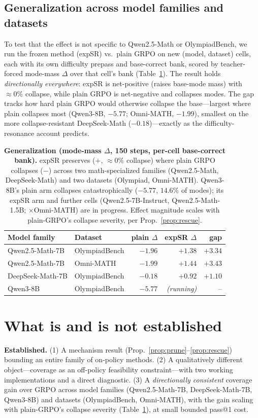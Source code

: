 \documentclass[11pt]{article}
\theoremstyle{definition}
\begin{document}
\subsection{Generalization across model families and datasets}
To test that the effect is not specific to Qwen2.5-Math or OlympiadBench, we run the frozen method
(expSR) vs.\ plain GRPO on new (model, dataset) cells, each with its own difficulty prepass and
base-correct bank, scored by teacher-forced mode-mass $\Delta$ over that cell's bank
(Table~\ref{tab:diversity}). The result holds \emph{directionally everywhere}: expSR is net-positive
(raises base-mode mass) with $\approx0\%$ collapse, while plain GRPO is net-negative and collapses
modes. The gap tracks how hard plain GRPO would otherwise collapse the base---largest where plain
collapses most (Qwen3-8B, $-5.77$; Omni-MATH, $-1.99$), smallest on the more collapse-resistant
DeepSeek-Math ($-0.18$)---exactly as the difficulty-resonance account predicts.

\begin{table}[h]\centering\small
\begin{tabular}{llrrr}
\toprule
Model family & Dataset & plain $\Delta$ & expSR $\Delta$ & gap \\
\midrule
Qwen2.5-Math-7B      & OlympiadBench & $-1.96$ & $\mathbf{+1.38}$ & $+3.34$\\
Qwen2.5-Math-7B      & Omni-MATH     & $-1.99$ & $\mathbf{+1.44}$ & $+3.43$\\
DeepSeek-Math-7B     & OlympiadBench & $-0.18$ & $\mathbf{+0.92}$ & $+1.10$\\
Qwen3-8B             & OlympiadBench & $-5.77$ & \emph{(running)} & --\\
\bottomrule
\end{tabular}
\caption{\textbf{Generalization (mode-mass $\Delta$, 150 steps, per-cell base-correct bank).} expSR
preserves ($+$, $\approx0\%$ collapse) where plain GRPO collapses ($-$) across two math-specialized
families (Qwen2.5-Math, DeepSeek-Math) and two datasets (Olympiad, Omni-MATH). Qwen3-8B's plain arm
collapses catastrophically ($-5.77$, $14.6\%$ of modes); its expSR arm and further cells
(Qwen2.5-7B-Instruct, Qwen2.5-Math-1.5B; $\times$Omni-MATH) are in progress. Effect magnitude scales
with plain-GRPO's collapse severity, per Prop.~\ref{prop:rescue}.}
\label{tab:diversity}
\end{table}

\section{What is and is not established}
\textbf{Established.} (1) A mechanism result (Prop.~\ref{prop:prune}--\ref{prop:rescue}) bounding an
entire family of on-policy methods. (2) A qualitatively different object---coverage as an off-policy
feasibility constraint---with two working implementations and a direct diagnostic. (3) A
\emph{directionally consistent} coverage gain over GRPO across model families (Qwen2.5-Math-7B,
DeepSeek-Math-7B, Qwen3-8B) and datasets (OlympiadBench, Omni-MATH), with the gain scaling with
plain-GRPO's collapse severity (Table~\ref{tab:diversity}), at small bounded pass@1 cost.
\end{document}
